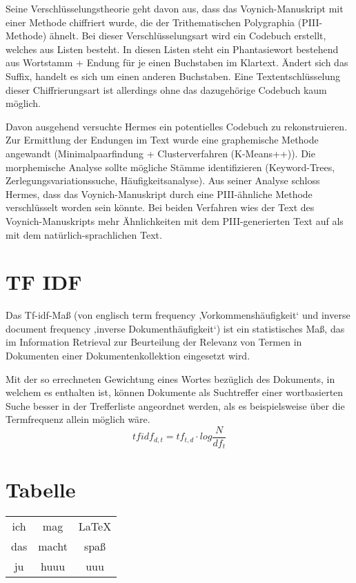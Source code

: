 \documentclass[12]{scrartcl}
\begin{document}
Seine Verschlüsselungstheorie geht davon aus, dass das Voynich-Manuskript mit einer Methode chiffriert wurde, die der Trithematischen Polygraphia (PIII-Methode) ähnelt. Bei dieser Verschlüsselungsart wird ein Codebuch erstellt, welches aus Listen besteht. In diesen Listen steht ein Phantasiewort bestehend aus Wortstamm + Endung für je einen Buchstaben im Klartext. Ändert sich das Suffix, handelt es sich um einen anderen Buchstaben. Eine Textentschlüsselung dieser Chiffrierungsart ist allerdings ohne das dazugehörige Codebuch kaum möglich.

Davon ausgehend versuchte Hermes ein potentielles Codebuch zu rekonstruieren. Zur Ermittlung der Endungen im Text wurde eine graphemische Methode angewandt (Minimalpaarfindung + Clusterverfahren (K-Means++)). Die morphemische Analyse sollte mögliche Stämme identifizieren (Keyword-Trees, Zerlegungsvariationssuche, Häufigkeitsanalyse). Aus seiner Analyse schloss Hermes, dass das Voynich-Manuskript durch eine PIII-ähnliche Methode verschlüsselt worden sein könnte. Bei beiden Verfahren wies der Text des Voynich-Manuskripts mehr Ähnlichkeiten mit dem PIII-generierten Text auf als mit dem natürlich-sprachlichen Text.

\section{TF IDF}
Das Tf-idf-Maß (von englisch term frequency ‚Vorkommenshäufigkeit‘ und inverse document frequency ‚inverse Dokumenthäufigkeit‘) ist ein statistisches Maß, das im Information Retrieval zur Beurteilung der Relevanz von Termen in Dokumenten einer Dokumentenkollektion eingesetzt wird.

Mit der so errechneten Gewichtung eines Wortes bezüglich des Dokuments, in welchem es enthalten ist, können Dokumente als Suchtreffer einer wortbasierten Suche besser in der Trefferliste angeordnet werden, als es beispielsweise über die Termfrequenz allein möglich wäre.
\[tfidf_{d,t}= tf_{t,d} \cdot log \frac{N}{df_t} \]

\section {Tabelle}
\begin{center}
\begin{tabular}{ |c|c|c| } 
 \hline
 ich & mag & LaTeX \\ 
 das & macht & spaß \\ 
 ju & huuu & uuu \\ 
 \hline
\end{tabular}
\end{center}
    
\end{document}
